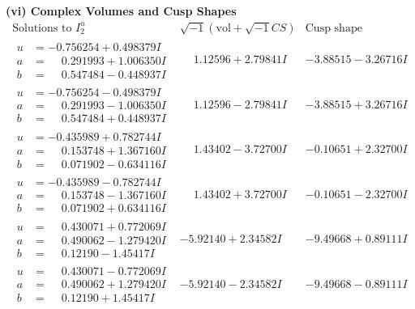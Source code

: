 \documentclass[1p]{elsarticle_modified}
\theoremstyle{definition}
\newcommand{\I}{\sqrt{-1}}
\begin{document}
\newpage\flushleft \textbf{(vi) Complex Volumes and Cusp Shapes}
$$\begin{array}{c|c|c}  
\text{Solutions to }I^u_{2}& \I (\text{vol} + \sqrt{-1}CS) & \text{Cusp shape}\\
 \hline 
\begin{aligned}
u &= -0.756254 + 0.498379 I \\
a &= \phantom{-}0.291993 + 1.006350 I \\
b &= \phantom{-}0.547484 - 0.448937 I\end{aligned}
 & \phantom{-}1.12596 + 2.79841 I & -3.88515 - 3.26716 I \\ \hline\begin{aligned}
u &= -0.756254 - 0.498379 I \\
a &= \phantom{-}0.291993 - 1.006350 I \\
b &= \phantom{-}0.547484 + 0.448937 I\end{aligned}
 & \phantom{-}1.12596 - 2.79841 I & -3.88515 + 3.26716 I \\ \hline\begin{aligned}
u &= -0.435989 + 0.782744 I \\
a &= \phantom{-}0.153748 + 1.367160 I \\
b &= \phantom{-}0.071902 - 0.634116 I\end{aligned}
 & \phantom{-}1.43402 - 3.72700 I & -0.10651 + 2.32700 I \\ \hline\begin{aligned}
u &= -0.435989 - 0.782744 I \\
a &= \phantom{-}0.153748 - 1.367160 I \\
b &= \phantom{-}0.071902 + 0.634116 I\end{aligned}
 & \phantom{-}1.43402 + 3.72700 I & -0.10651 - 2.32700 I \\ \hline\begin{aligned}
u &= \phantom{-}0.430071 + 0.772069 I \\
a &= \phantom{-}0.490062 - 1.279420 I \\
b &= \phantom{-}0.12190 - 1.45417 I\end{aligned}
 & -5.92140 + 2.34582 I & -9.49668 + 0.89111 I \\ \hline\begin{aligned}
u &= \phantom{-}0.430071 - 0.772069 I \\
a &= \phantom{-}0.490062 + 1.279420 I \\
b &= \phantom{-}0.12190 + 1.45417 I\end{aligned}
 & -5.92140 - 2.34582 I & -9.49668 - 0.89111 I \\ \hline\begin{aligned}

\end{aligned}
\end{array}$$
\end{document}
